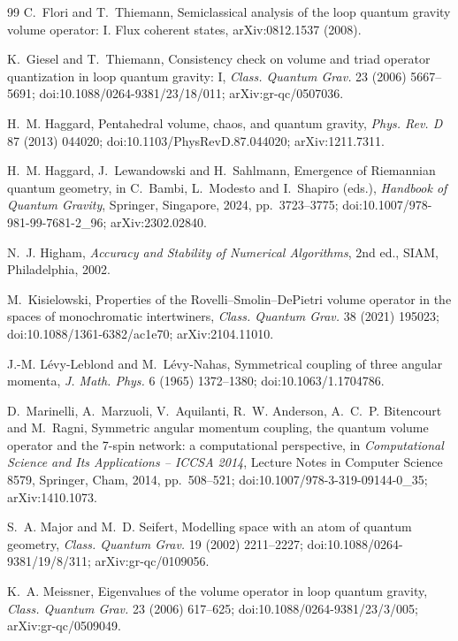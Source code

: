 \begin{thebibliography}{99}
C.~Flori and T.~Thiemann, Semiclassical analysis of the loop quantum gravity volume operator:
I. Flux coherent states, arXiv:0812.1537 (2008).

K.~Giesel and T.~Thiemann, Consistency check on volume and triad operator quantization in loop
quantum gravity: I, \emph{Class. Quantum Grav.} 23 (2006) 5667--5691;
doi:10.1088/0264-9381/23/18/011; arXiv:gr-qc/0507036.

H.~M. Haggard, Pentahedral volume, chaos, and quantum gravity, \emph{Phys. Rev. D} 87 (2013)
044020; doi:10.1103/PhysRevD.87.044020; arXiv:1211.7311.

H.~M. Haggard, J.~Lewandowski and H.~Sahlmann, Emergence of Riemannian quantum geometry, in
C.~Bambi, L.~Modesto and I.~Shapiro (eds.), \emph{Handbook of Quantum Gravity}, Springer,
Singapore, 2024, pp.~3723--3775; doi:10.1007/978-981-99-7681-2\_96; arXiv:2302.02840.

N.~J. Higham, \emph{Accuracy and Stability of Numerical Algorithms}, 2nd ed., SIAM,
Philadelphia, 2002.

M.~Kisielowski, Properties of the Rovelli--Smolin--DePietri volume operator in the spaces of
monochromatic intertwiners, \emph{Class. Quantum Grav.} 38 (2021) 195023;
doi:10.1088/1361-6382/ac1e70; arXiv:2104.11010.

J.-M. L\'evy-Leblond and M.~L\'evy-Nahas, Symmetrical coupling of three angular momenta,
\emph{J. Math. Phys.} 6 (1965) 1372--1380; doi:10.1063/1.1704786.

D.~Marinelli, A.~Marzuoli, V.~Aquilanti, R.~W. Anderson, A.~C.~P. Bitencourt and M.~Ragni,
Symmetric angular momentum coupling, the quantum volume operator and the 7-spin network: a
computational perspective, in \emph{Computational Science and Its Applications -- ICCSA 2014},
Lecture Notes in Computer Science 8579, Springer, Cham, 2014, pp.~508--521;
doi:10.1007/978-3-319-09144-0\_35; arXiv:1410.1073.

S.~A. Major and M.~D. Seifert, Modelling space with an atom of quantum geometry,
\emph{Class. Quantum Grav.} 19 (2002) 2211--2227; doi:10.1088/0264-9381/19/8/311;
arXiv:gr-qc/0109056.

K.~A. Meissner, Eigenvalues of the volume operator in loop quantum gravity, \emph{Class. Quantum
Grav.} 23 (2006) 617--625; doi:10.1088/0264-9381/23/3/005; arXiv:gr-qc/0509049.


\end{thebibliography}
